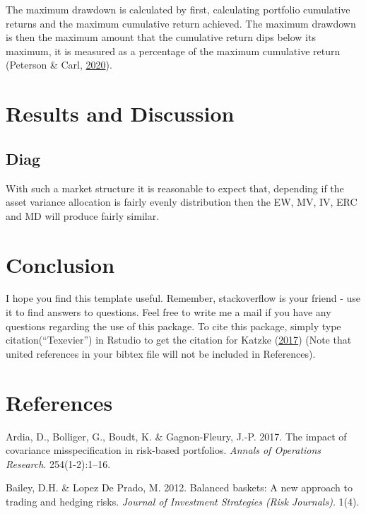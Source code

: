 \documentclass[11pt,preprint, authoryear]{elsarticle}
\numberwithin{equation}{section}
\numberwithin{figure}{section}
\numberwithin{table}{section}
\begin{document}
The maximum drawdown is calculated by first, calculating portfolio
cumulative returns and the maximum cumulative return achieved. The
maximum drawdown is then the maximum amount that the cumulative return
dips below its maximum, it is measured as a percentage of the maximum
cumulative return (Peterson \& Carl,
\protect\hyperlink{ref-PerformanceAnalytics}{2020}).

\hypertarget{results-and-discussion}{%
\section{Results and Discussion}\label{results-and-discussion}}

\hypertarget{diag}{%
\subsection{Diag}\label{diag}}

With such a market structure it is reasonable to expect that, depending
if the asset variance allocation is fairly evenly distribution then the
EW, MV, IV, ERC and MD will produce fairly similar.

\hypertarget{conclusion}{%
\section{Conclusion}\label{conclusion}}

I hope you find this template useful. Remember, stackoverflow is your
friend - use it to find answers to questions. Feel free to write me a
mail if you have any questions regarding the use of this package. To
cite this package, simply type citation(``Texevier'') in Rstudio to get
the citation for Katzke (\protect\hyperlink{ref-Texevier}{2017}) (Note
that united references in your bibtex file will not be included in
References).

\newpage

\hypertarget{references}{%
\section*{References}\label{references}}

\hypertarget{refs}{}
\leavevmode\hypertarget{ref-ardia2017}{}%
Ardia, D., Bolliger, G., Boudt, K. \& Gagnon-Fleury, J.-P. 2017. The
impact of covariance misspecification in risk-based portfolios.
\emph{Annals of Operations Research}. 254(1-2):1--16.

\leavevmode\hypertarget{ref-lopez2012}{}%
Bailey, D.H. \& Lopez De Prado, M. 2012. Balanced baskets: A new
approach to trading and hedging risks. \emph{Journal of Investment
Strategies (Risk Journals)}. 1(4).
\end{document}
